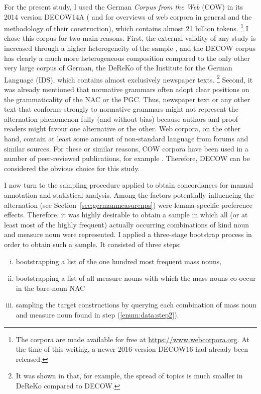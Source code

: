 \documentclass[USenglish]{article}
\begin{document}
For the present study, I used the German \textit{Corpus from the Web} (COW) in its 2014 version DECOW14A (\citealp{SchaeferBildhauer2012full,Schaefer2015b} and \citealp{BiemannEa2013,SchaeferBildhauer2013} for overviews of web corpora in general and the methodology of their construction), which contains almost 21 billion tokens.%
\footnote{The corpora are made available for free at \url{https://www.webcorpora.org}.
At the time of this writing, a newer 2016 version DECOW16 had already been released.}
I chose this corpus for two main reasons.
First, the external validity of any study is increased through a higher heterogeneity of the sample \citep[30]{MaxwellDelaney2004}, and the DECOW corpus has clearly a much more heterogeneous composition compared to the only other very large corpus of German, the DeReKo \citep{KupietzEa2010} of the Institute for the German Language (IDS), which contains almost exclusively newspaper texts.%
\footnote{It was shown in \cite{W16-2601} that, for example, the spread of topics is much smaller in DeReKo compared to DECOW.}
Second, it was already mentioned that normative grammars often adopt clear positions on the grammaticality of the NAC or the PGC.
Thus, newspaper text or any other text that conforms strongly to normative grammars might not represent the alternation phenomenon fully (and without bias) because authors and proof-readers might favour one alternative or the other.
Web corpora, on the other hand, contain at least some amount of non-standard language from forums and similar sources.
For these or similar reasons, COW corpora have been used in a number of peer-reviewed publications, for example \cite{VanGoethemHiligsmann2014,VanGoethemHuening2015,MuellerS2014,Schaefer2016c,SchaeferSayatz2014,SchaeferSayatz2016,Zimmer2015}. 
Therefore, DECOW can be considered the obvious choice for this study.

I now turn to the sampling procedure applied to obtain concordances for manual annotation and statistical analysis.
Among the factors potentially influencing the alternation (see Section~\ref{sec:germanmeasurenps}) were lemma-specific preference effects.
Therefore, it was highly desirable to obtain a sample in which all (or at least most of the highly frequent) actually occurring combinations of kind noun and measure noun were represented.
I applied a three-stage bootstrap process in order to obtain such a sample.
It consisted of three steps:

\begin{enumerate}[i.]
  \item\label{enum:data:step1} bootstrapping a list of the one hundred most frequent mass nouns,
  \item\label{enum:data:step2} bootstrapping a list of all measure nouns with which the mass nouns co-occur in the bare-noun NAC 
  \item\label{enum:data:step3} sampling the target constructions by querying each combination of mass noun and measure noun found in step (\ref{enum:data:step2}).
\end{enumerate}
\end{document}
